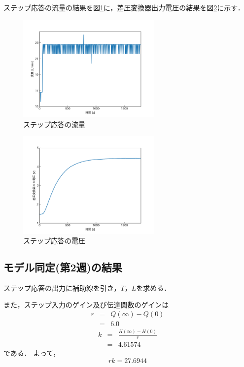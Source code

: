\documentclass[12pt]{jsarticle}
\begin{document}
ステップ応答の流量の結果を図\ref{Result-StepResponse-Q}に，差圧変換器出力電圧の結果を図\ref{Result-StepResponse-V}に示す．
\begin{figure}[tb]
  \begin{center}
    \includegraphics[clip,width=7.0cm]{../graph/StepResponseQ.png}
    \caption{ステップ応答の流量}
    \label{Result-StepResponse-Q}
  \end{center}
\end{figure}
\begin{figure}[tb]
  \begin{center}
    \includegraphics[clip,width=7.0cm]{../graph/StepResponseV.png}
    \caption{ステップ応答の電圧}
    \label{Result-StepResponse-V}
  \end{center}
\end{figure}

\subsection{モデル同定(第2週)の結果}
ステップ応答の出力に補助線を引き，$T$，$L$を求める．

また，ステップ入力のゲイン及び伝達関数のゲインは
\begin{eqnarray}
  \label{}
  r &=& Q(\infty) - Q(0) \\
  &=& 6.0
\end{eqnarray}
\begin{eqnarray}
  \label{}
  k &=& \frac{H(\infty) - H(0)}{r} \\
  &=& 4.61574
\end{eqnarray}
である．
よって，
\begin{equation}
  \label{}
  rk = 27.6944
\end{equation}
\end{document}
